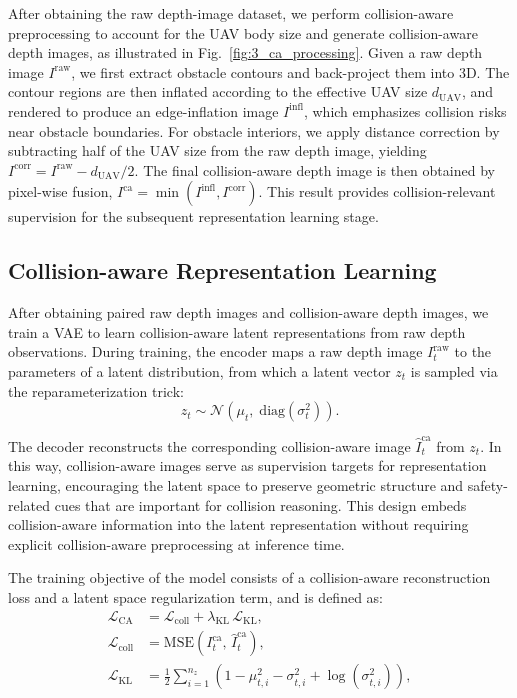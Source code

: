 \documentclass[letterpaper, 10 pt, conference]{ieeeconf}  %
\begin{document}
After obtaining the raw depth-image dataset, we perform collision-aware preprocessing to account for the UAV body size and generate collision-aware depth images, as illustrated in Fig.~\ref{fig:3_ca_processing}. 
Given a raw depth image $I^{\mathrm{raw}}$, we first extract obstacle contours and back-project them into 3D. 
The contour regions are then inflated according to the effective UAV size $d_{\mathrm{UAV}}$, and rendered to produce an edge-inflation image $I^{\mathrm{infl}}$, which emphasizes collision risks near obstacle boundaries. 
For obstacle interiors, we apply distance correction by subtracting half of the UAV size from the raw depth image, yielding $I^{\mathrm{corr}} = I^{\mathrm{raw}} - d_{\mathrm{UAV}}/2$. 
The final collision-aware depth image is then obtained by pixel-wise fusion, $I^{\mathrm{ca}} = \min\left(I^{\mathrm{infl}}, I^{\mathrm{corr}}\right)$. 
This result provides collision-relevant supervision for the subsequent representation learning stage.

\subsection{Collision-aware Representation Learning}
After obtaining paired raw depth images and collision-aware depth images, we train a VAE to learn collision-aware latent representations from raw depth observations. 
During training, the encoder maps a raw depth image $I_t^{\mathrm{raw}}$ to the parameters of a latent distribution, from which a latent vector $z_t$ is sampled via the reparameterization trick:
\begin{equation}
z_t \sim \mathcal{N}\!\left( \mu_t,\; \mathrm{diag}(\sigma_t^2) \right).
\end{equation}

The decoder reconstructs the corresponding collision-aware image $\hat{I}_t^{\mathrm{ca}}$ from $z_t$. 
In this way, collision-aware images serve as supervision targets for representation learning, encouraging the latent space to preserve geometric structure and safety-related cues that are important for collision reasoning. 
This design embeds collision-aware information into the latent representation without requiring explicit collision-aware preprocessing at inference time.

The training objective of the model consists of a collision-aware reconstruction loss and a latent space regularization term, and is defined as:
\begin{equation}
\begin{aligned}
\mathcal{L}_{\mathrm{CA}} &= \mathcal{L}_{\mathrm{coll}} + \lambda_{\mathrm{KL}}\,\mathcal{L}_{\mathrm{KL}},\\
\mathcal{L}_{\mathrm{coll}} &= \mathrm{MSE}\!\left(I_t^{\mathrm{ca}},\,\hat{I}_t^{\mathrm{ca}}\right),\\
\mathcal{L}_{\mathrm{KL}} &= \frac{1}{2}\sum_{i=1}^{n_z}
\left(1-\mu_{t,i}^2-\sigma_{t,i}^2+\log(\sigma_{t,i}^2)\right),
\end{aligned}
\label{eq:ca_loss}
\end{equation}
\end{document}
